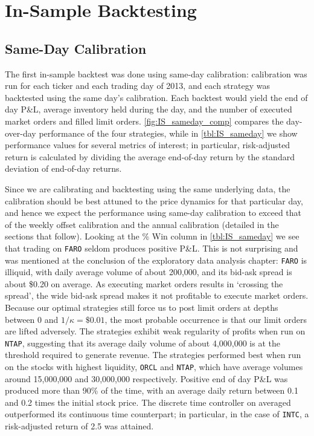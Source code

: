\FloatBarrier
\section{In-Sample Backtesting}

\subsection{Same-Day Calibration}
The first in-sample backtest was done using same-day calibration: calibration was run for each ticker and each trading day of 2013, and each strategy was backtested using the same day's calibration. Each backtest would yield the end of day P\&L, average inventory held during the day, and the number of executed market orders and filled limit orders. \autoref{fig:IS_sameday_comp} compares the day-over-day performance of the four strategies, while in \autoref{tbl:IS_sameday} we show performance values for several metrics of interest; in particular, risk-adjusted return is calculated by dividing the average end-of-day return by the standard deviation of end-of-day returns.

Since we are calibrating and backtesting using the same underlying data, the calibration should be best attuned to the price dynamics for that particular day, and hence we expect the performance using same-day calibration to exceed that of the weekly offset calibration and the annual calibration (detailed in the sections that follow). Looking at the \% Win column in \autoref{tbl:IS_sameday} we see that trading on \texttt{FARO} seldom produces positive P\&L. This is not surprising and was mentioned at the conclusion of the exploratory data analysis chapter: \texttt{FARO} is illiquid, with daily average volume of about 200,000, and its bid-ask spread is about \$0.20 on average. As executing market orders results in `crossing the spread', the wide bid-ask spread makes it not profitable to execute market orders. Because our optimal strategies still force us to post limit orders at depths between 0 and $1/\kappa = \$0.01$, the most probable occurrence is that our limit orders are lifted adversely. The strategies exhibit weak regularity of profits when run on \texttt{NTAP}, suggesting that its average daily volume of about 4,000,000 is at the threshold required to generate revenue. The strategies performed best when run on the stocks with highest liquidity, \texttt{ORCL} and \texttt{NTAP}, which have average volumes around 15,000,000 and 30,000,000 respectively. Positive end of day P\&L was produced more than 90\% of the time, with an average daily return between 0.1 and 0.2 times the initial stock price. The discrete time controller on averaged outperformed its continuous time counterpart; in particular, in the case of \texttt{INTC}, a risk-adjusted return of 2.5 was attained.

